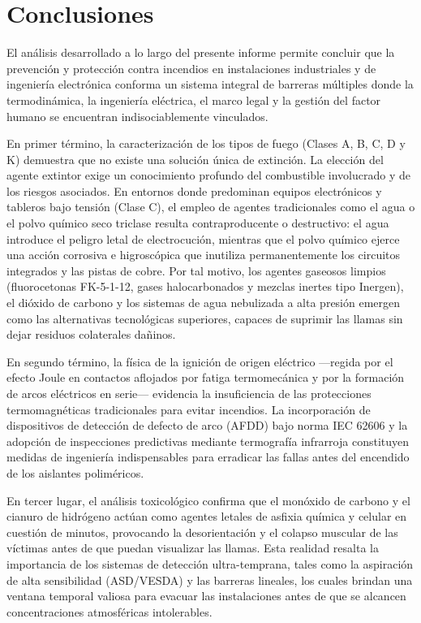 \chapter{Conclusiones}
\label{sec.cap9:conclusiones}

El análisis desarrollado a lo largo del presente informe permite concluir que la prevención y protección contra
incendios en instalaciones industriales y de ingeniería electrónica conforma un sistema integral de barreras múltiples
donde la termodinámica, la ingeniería eléctrica, el marco legal y la gestión del factor humano se encuentran
indisociablemente vinculados.

En primer término, la caracterización de los tipos de fuego (Clases A, B, C, D y K) demuestra que no existe una solución
única de extinción. La elección del agente extintor exige un conocimiento profundo del combustible involucrado y de los
riesgos asociados. En entornos donde predominan equipos electrónicos y tableros bajo tensión (Clase C), el empleo de
agentes tradicionales como el agua o el polvo químico seco triclase resulta contraproducente o destructivo: el agua
introduce el peligro letal de electrocución, mientras que el polvo químico ejerce una acción corrosiva e higroscópica que
inutiliza permanentemente los circuitos integrados y las pistas de cobre. Por tal motivo, los agentes gaseosos limpios
(fluorocetonas FK-5-1-12, gases halocarbonados y mezclas inertes tipo Inergen), el dióxido de carbono y los sistemas de
agua nebulizada a alta presión emergen como las alternativas tecnológicas superiores, capaces de suprimir las llamas sin
dejar residuos colaterales dañinos.

En segundo término, la física de la ignición de origen eléctrico —regida por el efecto Joule en contactos aflojados por
fatiga termomecánica y por la formación de arcos eléctricos en serie— evidencia la insuficiencia de las protecciones
termomagnéticas tradicionales para evitar incendios. La incorporación de dispositivos de detección de defecto de arco
(AFDD) bajo norma IEC 62606 y la adopción de inspecciones predictivas mediante termografía infrarroja constituyen
medidas de ingeniería indispensables para erradicar las fallas antes del encendido de los aislantes poliméricos.

En tercer lugar, el análisis toxicológico confirma que el monóxido de carbono y el cianuro de
hidrógeno actúan como agentes letales de asfixia química y celular en cuestión de minutos, provocando la desorientación y
el colapso muscular de las víctimas antes de que puedan visualizar las llamas. Esta realidad resalta la importancia de
los sistemas de detección ultra-temprana, tales como la aspiración de alta sensibilidad (ASD/VESDA) y las barreras
lineales, los cuales brindan una ventana temporal valiosa para evacuar las instalaciones antes de que se alcancen
concentraciones atmosféricas intolerables.

